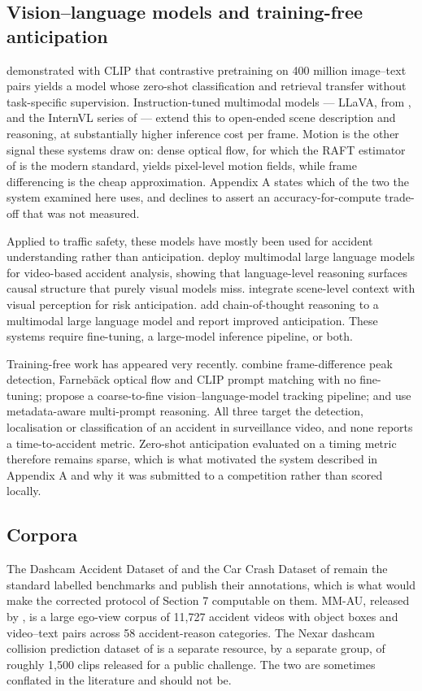 \subsection{Vision--language models and training-free anticipation}
\citet{radford2021clip} demonstrated with CLIP that contrastive pretraining on 400 million image--text pairs yields a model whose zero-shot classification and retrieval transfer without task-specific supervision. Instruction-tuned multimodal models --- LLaVA, from \citet{liu2023llava}, and the InternVL series of \citet{chen2024internvl} --- extend this to open-ended scene description and reasoning, at substantially higher inference cost per frame. Motion is the other signal these systems draw on: dense optical flow, for which the RAFT estimator of \citet{teed2020raft} is the modern standard, yields pixel-level motion fields, while frame differencing is the cheap approximation. Appendix A states which of the two the system examined here uses, and declines to assert an accuracy-for-compute trade-off that was not measured.

Applied to traffic safety, these models have mostly been used for accident understanding rather than anticipation. \citet{zhang2025seeunsafe} deploy multimodal large language models for video-based accident analysis, showing that language-level reasoning surfaces causal structure that purely visual models miss. \citet{zhang2025camera} integrate scene-level context with visual perception for risk anticipation. \citet{liao2025cot} add chain-of-thought reasoning to a multimodal large language model and report improved anticipation. These systems require fine-tuning, a large-model inference pipeline, or both.

Training-free work has appeared very recently. \citet{thakur2026modular} combine frame-difference peak detection, Farnebäck optical flow and CLIP prompt matching with no fine-tuning; \citet{saha2026zeroshot} propose a coarse-to-fine vision--language-model tracking pipeline; and \citet{singh2026metadata} use metadata-aware multi-prompt reasoning. All three target the detection, localisation or classification of an accident in surveillance video, and none reports a time-to-accident metric. Zero-shot anticipation evaluated on a timing metric therefore remains sparse, which is what motivated the system described in Appendix A and why it was submitted to a competition rather than scored locally.

\subsection{Corpora}
The Dashcam Accident Dataset of \citet{chan2016dad} and the Car Crash Dataset of \citet{bao2020ccd} remain the standard labelled benchmarks and publish their annotations, which is what would make the corrected protocol of Section 7 computable on them. MM-AU, released by \citet{fang2024mmau}, is a large ego-view corpus of 11,727 accident videos with object boxes and video--text pairs across 58 accident-reason categories. The Nexar dashcam collision prediction dataset of \citet{moura2025nexar} is a separate resource, by a separate group, of roughly 1,500 clips released for a public challenge. The two are sometimes conflated in the literature and should not be.

